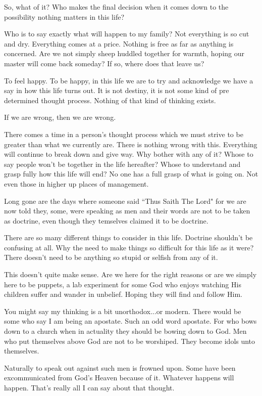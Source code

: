 So, what of it? Who makes the final decision when it comes down to the
possibility nothing matters in this life?

Who is to say exactly what will happen to my family? Not everything is so cut
and dry. Everything comes at a price. Nothing is free as far as anything is
concerned. Are we not simply sheep huddled together for warmth, hoping our
master will come back someday? If so, where does that leave us?

To feel happy. To be happy, in this life we are to try and acknowledge we have a
say in how this life turns out. It is not destiny, it is not some kind of pre
determined thought process. Nothing of that kind of thinking exists.

If we are wrong, then we are wrong.

There comes a time in a person's thought process which we must strive to be
greater than what we currently are. There is nothing wrong with this. Everything
will continue to break down and give way. Why bother with any of it? Whose to
say people won't be together in the life hereafter? Whose to understand and
grasp fully how this life will end? No one has a full grasp of what is going on.
Not even those in higher up places of management.

Long gone are the days where someone said ``Thus Saith The Lord" for we are now
told they, some, were speaking as men and their words are not to be taken as
doctrine, even though they temselves claimed it to be doctrine.

There are so many different things to consider in this life. Doctrine shouldn't
be confusing at all. Why the need to make things so difficult for this life as
it were? There doesn't need to be anything so stupid or selfish from any of it.

This doesn't quite make sense. Are we here for the right reasons or are we
simply here to be puppets, a lab experiment for some God who enjoys watching His
children suffer and wander in unbelief. Hoping they will find and follow Him.

You might say my thinking is a bit unorthodox...or modern. There would be some
who say I am being an apostate. Such an odd word apostate. For who bows down to
a church when in actuality they should be bowing down to God. Men who put
themselves above God are not to be worshiped. They become idols unto themselves.

Naturally to speak out against such men is frowned upon. Some have been
excommunicated from God's Heaven because of it. Whatever happens will happen.
That's really all I can say about that thought.